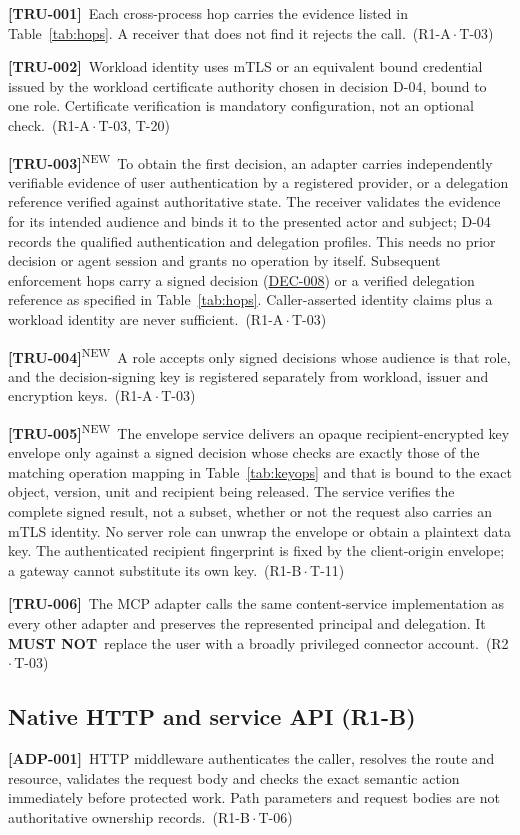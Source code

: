 \documentclass[11pt,a4paper]{article}
\newcommand{\mustnot}{\textbf{MUST NOT}}
\newcommand{\rr}[1]{\hyperlink{req:#1}{#1}}
\newcommand{\reqtag}[2]{{\footnotesize\color{accent}(#1\,$\cdot$\,#2)}}
\newcommand{\req}[4]{\par\noindent\hypertarget{req:#1}{\textbf{[#1]}}\ #4\ \reqtag{#2}{#3}\par}
\newcommand{\reqn}[4]{\par\noindent\hypertarget{req:#1}{\textbf{[#1]}}\textsuperscript{\color{accent}\tiny NEW}\ #4\ \reqtag{#2}{#3}\par}
\begin{document}
\req{TRU-001}{R1-A}{T-03}{Each cross-process hop carries the evidence listed in Table~\ref{tab:hops}. A receiver that does not find it rejects the call.}
\req{TRU-002}{R1-A}{T-03, T-20}{Workload identity uses mTLS or an equivalent bound credential issued by the workload certificate authority chosen in decision D-04, bound to one role. Certificate verification is mandatory configuration, not an optional check.}
\reqn{TRU-003}{R1-A}{T-03}{To obtain the first decision, an adapter carries independently verifiable evidence of user authentication by a registered provider, or a delegation reference verified against authoritative state. The receiver validates the evidence for its intended audience and binds it to the presented actor and subject; D-04 records the qualified authentication and delegation profiles. This needs no prior decision or agent session and grants no operation by itself. Subsequent enforcement hops carry a signed decision (\rr{DEC-008}) or a verified delegation reference as specified in Table~\ref{tab:hops}. Caller-asserted identity claims plus a workload identity are never sufficient.}
\reqn{TRU-004}{R1-A}{T-03}{A role accepts only signed decisions whose audience is that role, and the decision-signing key is registered separately from workload, issuer and encryption keys.}
\reqn{TRU-005}{R1-B}{T-11}{The envelope service delivers an opaque recipient-encrypted key envelope only against a signed decision whose checks are exactly those of the matching operation mapping in Table~\ref{tab:keyops} and that is bound to the exact object, version, unit and recipient being released. The service verifies the complete signed result, not a subset, whether or not the request also carries an mTLS identity. No server role can unwrap the envelope or obtain a plaintext data key. The authenticated recipient fingerprint is fixed by the client-origin envelope; a gateway cannot substitute its own key.}
\req{TRU-006}{R2}{T-03}{The MCP adapter calls the same content-service implementation as every other adapter and preserves the represented principal and delegation. It \mustnot\ replace the user with a broadly privileged connector account.}

\subsection{Native HTTP and service API (R1-B)}
\req{ADP-001}{R1-B}{T-06}{HTTP middleware authenticates the caller, resolves the route and resource, validates the request body and checks the exact semantic action immediately before protected work. Path parameters and request bodies are not authoritative ownership records.}
\end{document}
